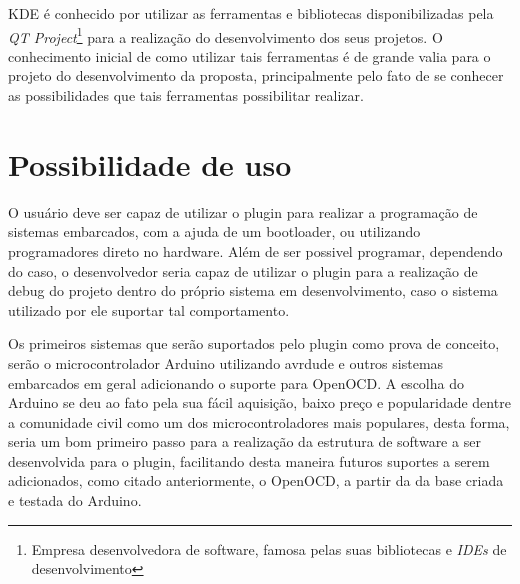 
KDE é conhecido por utilizar as ferramentas e bibliotecas disponibilizadas pela \textit{QT Project}\footnote{Empresa desenvolvedora  de software, famosa pelas suas bibliotecas e \textit{IDEs} de desenvolvimento} para a realização do desenvolvimento dos seus projetos. O conhecimento inicial de como utilizar tais ferramentas é de grande valia para o projeto do desenvolvimento da proposta, principalmente pelo fato de se conhecer as possibilidades que tais ferramentas possibilitar realizar.

\section{Possibilidade de uso}
O usuário deve ser capaz de utilizar o plugin para realizar a programação de sistemas embarcados, com a ajuda de um bootloader, ou utilizando programadores direto no hardware. Além de ser possivel programar, dependendo do caso, o desenvolvedor seria capaz de utilizar o plugin para a realização de debug do projeto dentro do próprio sistema em desenvolvimento, caso o sistema utilizado por ele
suportar tal comportamento.

Os primeiros sistemas que serão suportados pelo plugin como prova de conceito, serão o microcontrolador Arduino utilizando avrdude e outros sistemas embarcados em geral adicionando o suporte para OpenOCD. A escolha do Arduino se deu ao fato pela sua fácil aquisição, baixo preço e popularidade dentre a comunidade civil como um dos microcontroladores mais populares, desta forma, seria um bom primeiro
passo para a realização da estrutura de software a ser desenvolvida para o plugin, facilitando desta maneira futuros suportes a serem adicionados, como citado anteriormente, o OpenOCD, a partir da da base criada e testada do Arduino.

